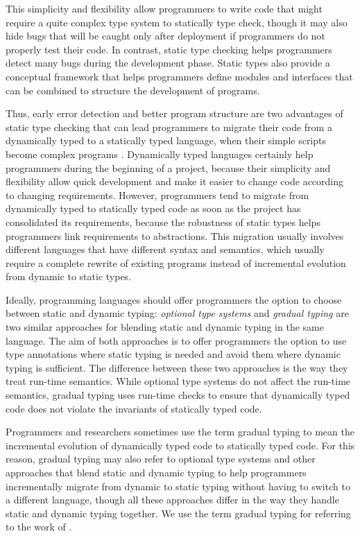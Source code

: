 \documentclass[preprint]{sig-alternate}
\begin{document}
This simplicity and flexibility allow programmers to write code that
might require a quite complex type system to statically type check,
though it may also hide bugs that will be caught only after deployment
if programmers do not properly test their code.
In contrast, static type checking helps programmers detect many 
bugs during the development phase.
Static types also provide a conceptual framework that helps
programmers define modules and interfaces that can be combined to
structure the development of programs.

Thus, early error detection and better program structure are two
advantages of static type checking that can lead programmers to
migrate their code from a dynamically typed to a statically
typed language, when their simple scripts become complex programs
\citep{tobin-hochstadt2006ims}.
Dynamically typed languages certainly help programmers during the
beginning of a project, because their simplicity and flexibility
allow quick development and make it easier to change code according to
changing requirements.
However, programmers tend to migrate from dynamically typed to
statically typed code as soon as the project has consolidated its
requirements, because the robustness of static types helps
programmers link requirements to abstractions.
This migration usually involves different languages that have
different syntax and semantics, which usually require a complete
rewrite of existing programs instead of incremental evolution from
dynamic to static types.

Ideally, programming languages should offer programmers the
option to choose between static and dynamic typing:
\textit{optional type systems} \citep{bracha2004pluggable} and
\textit{gradual typing} \citep{siek2006gradual} are two similar
approaches for blending static and dynamic typing in the same
language.
The aim of both approaches is to offer programmers the option
to use type annotations where static typing is needed and avoid them
where dynamic typing is sufficient.
The difference between these two approaches is the way they treat
run-time semantics.
While optional type systems do not affect the run-time semantics,
gradual typing uses run-time checks to ensure that dynamically typed
code does not violate the invariants of statically typed code.

Programmers and researchers sometimes use the term gradual typing
to mean the incremental evolution of dynamically typed code to
statically typed code.
For this reason, gradual typing may also refer to optional type
systems and other approaches that blend static and dynamic typing to
help programmers incrementally migrate from dynamic to static typing
without having to switch to a different language, though all these
approaches differ in the way they handle static and dynamic typing
together.
We use the term gradual typing for referring to the work of
\citet{siek2006gradual}.
\end{document}
